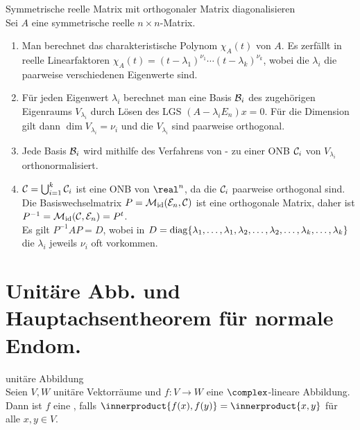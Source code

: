 \begin{Prozedur}%
{Symmetrische reelle Matrix mit orthogonaler Matrix diagonalisieren} \\
    Sei $A$ eine symmetrische reelle $n \times n$-Matrix.
    \begin{enumerate}
        \item Man berechnet das charakteristische Polynom $\chi_A(t)$ von $A$.
        Es zerfällt in reelle Linearfaktoren
        $\chi_A(t) = (t - \lambda_1)^{\nu_1} \cdots (t - \lambda_k)^{\nu_k}$,
        wobei die $\lambda_i$ die paarweise verschiedenen Eigenwerte sind.

        \item Für jeden Eigenwert $\lambda_i$ berechnet man eine Basis
        $\mathcal{B}_i$ des zugehörigen Eigenraums $V_{\lambda_i}$ durch Lösen
        des LGS $(A - \lambda_i E_n)x = 0$.
        Für die Dimension gilt dann $\dim V_{\lambda_i} = \nu_i$ und die
        $V_{\lambda_i}$ sind paarweise orthogonal.

        \item Jede Basis $\mathcal{B}_i$ wird mithilfe des Verfahrens
        von - zu einer ONB $\mathcal{C}_i$ von
        $V_{\lambda_i}$ orthonormalisiert.

        \item $\mathcal{C} = \bigcup_{i=1}^k \mathcal{C}_i$ ist eine ONB von
        $\real^n$, da die $\mathcal{C}_i$ paarweise orthogonal sind.
        Die Basiswechselmatrix $P = \mathcal{M}_{\operatorname{id}}(\mathcal{E}_n, \mathcal{C})$
        ist eine orthogonale Matrix, daher ist
        $P^{-1} = \mathcal{M}_{\operatorname{id}}(\mathcal{C}, \mathcal{E}_n) = P^t$. \\
        Es gilt $P^{-1} A P = D$, wobei in
        $D = \operatorname{diag}\{\lambda_1, \ldots, \lambda_1, \lambda_2, \ldots,
        \lambda_2, \ldots, \lambda_k, \ldots, \lambda_k\}$ die $\lambda_i$
        jeweils $\nu_i$ oft vorkommen.
    \end{enumerate}
\end{Prozedur}

\section{%
    Unitäre Abb. und Hauptachsentheorem für normale Endom.%
}

\begin{Def}{unitäre Abbildung} \\
    Seien $V, W$ unitäre Vektorräume und $f: V \rightarrow W$ eine
    $\complex$-lineare Abbildung. \\
    Dann ist $f$ eine , falls
    $\innerproduct{f(x), f(y)} = \innerproduct{x, y}$ für alle $x, y \in V$.
\end{Def}

